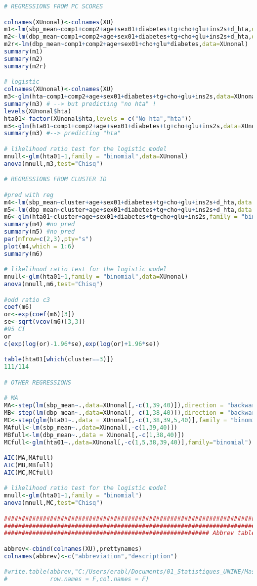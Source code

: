 \documentclass[a4paper]{book}
\begin{document}
\begin{lstlisting}[language=R]
# REGRESSIONS FROM PC SCORES

colnames(XUnonal)<-colnames(XU)
m1<-lm(sbp_mean~comp1+comp2+age+sex01+diabetes+tg+cho+glu+ins2s+d_hta,data=XUnonal)
m2<-lm(dbp_mean~comp1+comp2+age+sex01+diabetes+tg+cho+glu+ins2s+d_hta,data=XUnonal)
m2r<-lm(dbp_mean~comp1+comp2+age+sex01+cho+glu*diabetes,data=XUnonal)
summary(m1)
summary(m2)
summary(m2r)

# logistic
colnames(XUnonal)<-colnames(XU)
m3<-glm(hta~comp1+comp2+age+sex01+diabetes+tg+cho+glu+ins2s,data=XUnonal,family="binomial")
summary(m3) # --> but predicting "no hta" !
levels(XUnonal$hta)
hta01<-factor(XUnonal$hta,levels = c("No hta","hta"))
m3<-glm(hta01~comp1+comp2+age+sex01+diabetes+tg+cho+glu+ins2s,data=XUnonal,family="binomial")
summary(m3) #--> predicting "hta"

# likelihood ratio test for the logistic model
mnull<-glm(hta01~1,family = "binomial",data=XUnonal)
anova(mnull,m3,test="Chisq")

# REGRESSIONS FROM CLUSTER ID

#pred with reg
m4<-lm(sbp_mean~cluster+age+sex01+diabetes+tg+cho+glu+ins2s+d_hta,data = XUnonal)
m5<-lm(dbp_mean~cluster+age+sex01+diabetes+tg+cho+glu+ins2s+d_hta,data = XUnonal)
m6<-glm(hta01~cluster+age+sex01+diabetes+tg+cho+glu+ins2s,family = "binomial",data = XUnonal)
summary(m4) #no pred
summary(m5) #no pred
par(mfrow=c(2,3),pty="s")
plot(m4,which = 1:6)
summary(m6) 

# likelihood ratio test for the logistic model
mnull<-glm(hta01~1,family = "binomial",data=XUnonal)
anova(mnull,m6,test="Chisq")

#odd ratio c3
coef(m6)
or<-exp(coef(m6)[3])
se<-sqrt(vcov(m6)[3,3])
#95 CI
or
c(exp(log(or)-1.96*se),exp(log(or)+1.96*se)) 

table(hta01[which(cluster==3)])
111/114

# OTHER REGRESSIONS

# MA
MA<-step(lm(sbp_mean~.,data=XUnonal[,-c(1,39,40)]),direction = "backward")
MB<-step(lm(dbp_mean~.,data=XUnonal[,-c(1,38,40)]),direction = "backward")
MC<-step(glm(hta01~.,data = XUnonal[,-c(1,38,39,5,40)],family = "binomial"),direction = "backward")
MAfull<-lm(sbp_mean~.,data=XUnonal[,-c(1,39,40)])
MBfull<-lm(dbp_mean~.,data = XUnonal[,-c(1,38,40)])
MCfull<-glm(hta01~.,data=XUnonal[,-c(1,5,38,39,40)],family="binomial")

AIC(MA,MAfull)
AIC(MB,MBfull)
AIC(MC,MCfull)

# likelihood ratio test for the logistic model
mnull<-glm(hta01~1,family = "binomial")
anova(mnull,MC,test="Chisq")

#######################################################################
#######################################################################
########################################################## Abbrev table

abbrev<-cbind(colnames(XU),prettynames)
colnames(abbrev)<-c("abbreviation","description")

#write.table(abbrev,"C:/Users/erabl/Documents/01_Statistiques_UNINE/Master_thesis/thesis/des_abbrev.txt",eol="\n",quote=F,sep=": ",
#            row.names = F,col.names = F)
\end{lstlisting}
\end{document}
